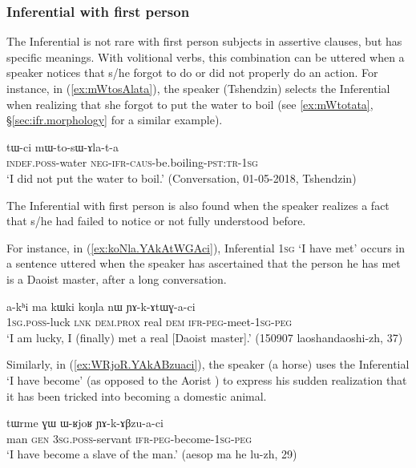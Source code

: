 \subsubsection{Inferential with first person} \label{sec:inf.1person}
The Inferential is not rare with first person subjects in assertive clauses, but has specific meanings.  With volitional verbs, this combination can be uttered when a speaker notices that s/he forgot to do or did not properly do an action. For instance, in (\ref{ex:mWtosAlata}), the speaker (Tshendzin) selects the Inferential when realizing that she forgot to put the water to boil (see \ref{ex:mWtotata}, §\ref{sec:ifr.morphology} for a similar example).

\begin{exe}
\ex \label{ex:mWtosAlata}
\gll tɯ-ci mɯ-to-sɯ-ɤla-t-a \\
\textsc{indef}.\textsc{poss}-water \textsc{neg}-\textsc{ifr}-\textsc{caus}-be.boiling-\textsc{pst}:\textsc{tr}-\textsc{1sg} \\
\glt `I did not put the water to boil.' (Conversation, 01-05-2018, Tshendzin)
\end{exe}

The Inferential with first person is also found when the speaker realizes a fact that s/he had failed to notice or not fully understood before.

For instance, in (\ref{ex:koNla.YAkAtWGAci}), Inferential \textsc{1sg}  `I have met' occurs in a sentence uttered when the speaker has ascertained that the person he has met is a Daoist master, after a long conversation.  

\begin{exe}
\ex \label{ex:koNla.YAkAtWGAci}
\gll  a-kʰi ma kɯki koŋla nɯ ɲɤ-k-ɤtɯɣ-a-ci \\
\textsc{1sg}.\textsc{poss}-luck \textsc{lnk} \textsc{dem}.\textsc{prox} real \textsc{dem} \textsc{ifr}-\textsc{peg}-meet-\textsc{1sg}-\textsc{peg} \\
\glt `I am lucky, I (finally) met a real [Daoist master].' (150907 laoshandaoshi-zh, 37)
\end{exe}

Similarly, in (\ref{ex:WRjoR.YAkABzuaci}), the speaker (a horse) uses the Inferential  `I have become' (as opposed to the Aorist ) to express his sudden realization that it has been tricked into becoming a domestic animal.

\begin{exe}
\ex \label{ex:WRjoR.YAkABzuaci}
\gll tɯrme ɣɯ ɯ-ʁjoʁ ɲɤ-k-ɤβzu-a-ci \\
man \textsc{gen} \textsc{3sg}.\textsc{poss}-servant \textsc{ifr}-\textsc{peg}-become-\textsc{1sg}-\textsc{peg} \\
\glt `I have become a slave of the man.' (aesop ma he lu-zh, 29)
\end{exe}

